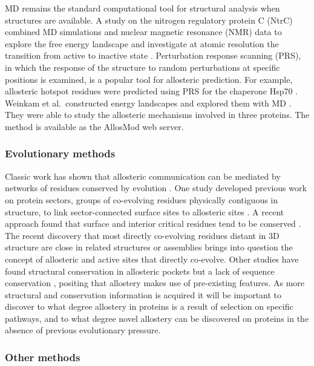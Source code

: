 MD remains the standard computational tool for structural analysis when structures are available.
A study on the nitrogen regulatory protein C (NtrC) combined MD simulations and nuclear magnetic resonance (NMR) data to explore the free energy landscape and investigate at atomic resolution the transition from active to inactive state \cite{Pontiggia2015}.
Perturbation response scanning (PRS), in which the response of the structure to random perturbations at specific positions is examined, is a popular tool for allosteric prediction.
For example, allosteric hotspot residues were predicted using PRS for the chaperone Hsp70 \cite{Penkler2017}.
Weinkam et al.\ constructed energy landscapes and explored them with MD \cite{Weinkam2012}.
They were able to study the allosteric mechanisms involved in three proteins.
The method is available as the AllosMod web server.


\subsubsection{Evolutionary methods}

Classic work has shown that allosteric communication can be mediated by networks of residues conserved by evolution \cite{Lockless1999, Suel2003}.
One study developed previous work on protein sectors, groups of co-evolving residues physically contiguous in structure, to link sector-connected surface sites to allosteric sites \cite{Reynolds2011}.
A recent approach found that surface and interior critical residues tend to be conserved \cite{Clarke2016}.
The recent discovery that most directly co-evolving residues distant in 3D structure are close in related structures or assemblies \cite{Anishchenko2017} brings into question the concept of allosteric and active sites that directly co-evolve.
Other studies have found structural conservation in allosteric pockets but a lack of sequence conservation \cite{Panjkovich2010, Panjkovich2013}, positing that allostery makes use of pre-existing features.
As more structural and conservation information is acquired it will be important to discover to what degree allostery in proteins is a result of selection on specific pathways, and to what degree novel allostery can be discovered on proteins in the absence of previous evolutionary pressure.


\subsubsection{Other methods}

